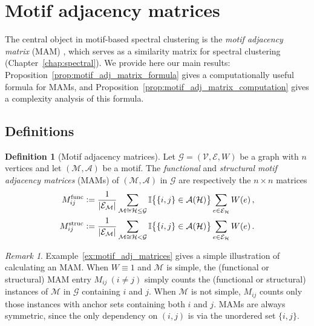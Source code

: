 \documentclass[12pt]{ociamthesis}
\theoremstyle{plain}
\theoremstyle{definition}
\newtheorem{definition}{Definition}[chapter]
\theoremstyle{remark}
\newtheorem*{remark}{Remark}
\newcommand\bb[1]{\mathbb{#1}}
\newcommand\ca[1]{\mathcal{#1}}
\begin{document}
\section{Motif adjacency matrices} \label{sec:graphs_motif_adj_matrices}

The central object in motif-based spectral clustering is the \emph{motif
adjacency matrix} (MAM) \cite{benson2016higher}, which serves as a similarity
matrix for spectral clustering (Chapter~\ref{chap:spectral}).
We provide here our main results:
Proposition~\ref{prop:motif_adj_matrix_formula} gives a computationally useful
formula for MAMs, and Proposition~\ref{prop:motif_adj_matrix_computation} gives
a complexity analysis of this formula.

\pagebreak

\subsection{Definitions}

\begin{definition}[Motif adjacency matrices] \label{def:motif_adj_matrices}
  Let $\ca{G} = (\ca{V,E},W)$ be a graph with $n$ vertices and let $\ca{(M,A)}$
  be a motif. The \emph{functional} and \emph{structural motif adjacency
  matrices} (MAMs) of $\ca{(M,A)}$ in $\ca{G}$ are respectively the $n \times
  n$ matrices
  \begin{align*}
    M^\mathrm{func}_{i j} &\vcentcolon= \frac{1}{|\ca{E_M}|} \sum_{\ca{M} \cong
    \ca{H} \leq \ca{G}} \bb{I} \big\{ \{i,j\} \in \ca{A}(\ca{H}) \big\} \sum_{e
    \in \ca{E_H}} W(e)\,, \\
    M^\mathrm{struc}_{i j} &\vcentcolon= \frac{1}{|\ca{E_M}|} \sum_{\ca{M} \cong
    \ca{H} < \ca{G}} \bb{I} \big\{ \{i,j\} \in \ca{A}(\ca{H}) \big\} \sum_{e
    \in \ca{E_H}} W(e)\,.
  \end{align*}
\end{definition}

\begin{remark}
  Example~\ref{ex:motif_adj_matrices} gives a simple illustration of
  calculating an MAM.
  When $W \equiv 1$ and $\ca{M}$ is simple, the (functional or structural) MAM
  entry $M_{i j} \ (i \neq j)$ simply counts the (functional or structural)
  instances of $\ca{M}$ in $\ca{G}$ containing $i$ and $j$.
  When $\ca{M}$ is not simple, $M_{i j}$ counts only those instances with anchor
  sets containing both $i$ and $j$.
  MAMs are always symmetric, since the only dependency on $(i,j)$ is via the
  unordered set $\{i,j\}$.
\end{remark}
\end{document}
